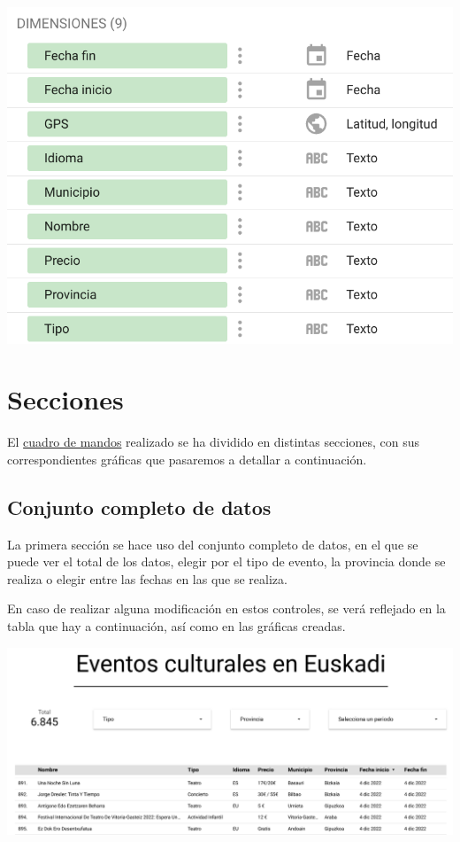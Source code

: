 \documentclass{\ClassPath/viu-tfm-template}
\begin{document}
\begin{center}
    \includegraphics[width=0.6\linewidth]{img/datos.png}
\end{center}

\section{Secciones}

El \href{https://datastudio.google.com/reporting/2322c44e-ad75-4243-a4a5-257be6d754bf/page/9AT6C}{cuadro de mandos} realizado se ha dividido en distintas secciones, con sus correspondientes gráficas que pasaremos a detallar a continuación.


\subsection{Conjunto completo de datos}

La primera sección se hace uso del conjunto completo de datos, en el que se puede ver el total de los datos, elegir por el tipo de evento, la provincia donde se realiza o elegir entre las fechas en las que se realiza.

En caso de realizar alguna modificación en estos controles, se verá reflejado en la tabla que hay a continuación, así como en las gráficas creadas.

\begin{center}
    \includegraphics[frame,width=0.83\linewidth]{img/cabecera.png}
\end{center}
\end{document}
